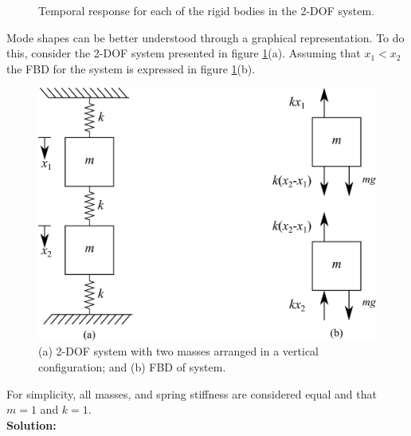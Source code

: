 \documentclass[12pt,letter]{article}
\begin{document}
\begin{example}
\begin{figure}[H]
		\caption{Temporal response for each of the rigid bodies in the 2-DOF system.}
	\end{figure}
	\end{example}
	
	
	
	
	
	\begin{example}
	Mode shapes can be better understood through a graphical representation. To do this, consider the 2-DOF system presented in figure \ref{fig:2-DOF-spring_mass_vertical}(a). Assuming that $x_1<x_2$ the FBD for the system is expressed in figure \ref{fig:2-DOF-spring_mass_vertical}(b).
	
	\begin{figure}[H]
		\centering
		\includegraphics[]{../figures/2-DOF-spring_mass_vertical_with_FBD.png}
		\caption{(a) 2-DOF system with two masses arranged in a vertical configuration; and (b) FBD of system.}
		\label{fig:2-DOF-spring_mass_vertical}
	\end{figure}
	\noindent For simplicity, all masses, and spring stiffness are considered equal and that $m=1$ and $k=1$. \\

\noindent \textbf{Solution:} 


\end{example}
\end{document}
